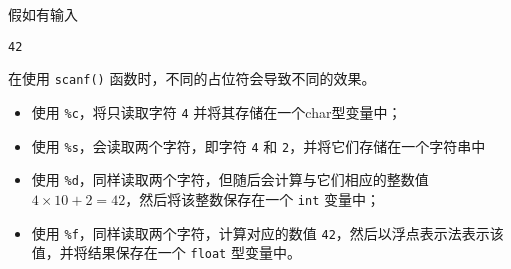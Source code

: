 \begin{frame}[fragile]
假如有输入
\begin{lstlisting}
42
\end{lstlisting}
在使用 \lstinline|scanf()| 函数时，不同的占位符会导致不同的效果。
\end{frame}

\begin{frame}[fragile]
\begin{itemize}
\item 使用 \lstinline|%c|，将只读取字符 \lstinline|4| 并将其存储在一个char型变量中；\\[0.1in]
\item 使用 \lstinline|%s|，会读取两个字符，即字符 \lstinline|4| 和 \lstinline|2|，并将它们存储在一个字符串中\\[0.1in]
\item 使用 \lstinline|%d|，同样读取两个字符，但随后会计算与它们相应的整数值$4\times 10+2=42$，然后将该整数保存在一个 \lstinline|int| 变量中；\\[0.1in]
\item 使用 \lstinline|%f|，同样读取两个字符，计算对应的数值 \lstinline|42|，然后以浮点表示法表示该值，并将结果保存在一个 \lstinline|float| 型变量中。
\end{itemize}
\end{frame}
